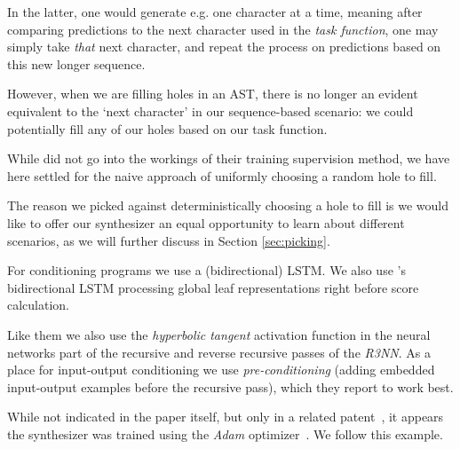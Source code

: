 \documentclass{article}
\begin{document}
In the latter, one would generate e.g. one character at a time,
meaning after comparing predictions to the next character used in the \emph{task function},
one may simply take \emph{that} next character,
and repeat the process on predictions based on this new longer sequence.

However, when we are filling holes in an AST,
there is no longer an evident equivalent to the `next character' in our sequence-based scenario:
we could potentially fill any of our holes based on our task function.

While \citet{nsps} did not go into the workings of their training supervision method,
we have here settled for the naive approach of uniformly choosing a random hole to fill.

The reason we picked against deterministically choosing a hole to fill is
we would like to offer our synthesizer an equal opportunity to learn about different scenarios,
as we will further discuss in Section \ref{sec:picking}.


For conditioning programs we use a (bidirectional) LSTM.
We also use \citet{nsps}'s bidirectional LSTM processing global leaf representations right before score calculation.

Like them we also use the \emph{hyperbolic tangent} activation function in the neural networks part of the recursive and reverse recursive passes of the \emph{R3NN}.
As a place for input-output conditioning we use \emph{pre-conditioning}
(adding embedded input-output examples before the recursive pass),
which they report to work best.

While not indicated in the paper itself,
but only in a related patent~\citep{mohamed2017neural},
it appears the synthesizer was trained using the \emph{Adam} optimizer~\citep{kingma2014adam}.
We follow this example.
\end{document}
